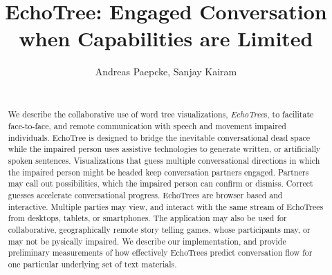 \documentclass{sigchi}
\begin{document}
\title{EchoTree: Engaged Conversation when Capabilities are Limited}



\author{
  \alignauthor Andreas Paepcke, Sanjay Kairam\\
    \\
    }



\maketitle

\begin{abstract}
We describe the collaborative use of word tree visualizations, {\em
  EchoTree}s, to facilitate face-to-face, and remote communication
with speech and movement impaired individuals. EchoTree is designed to
bridge the inevitable conversational dead space while the impaired
person uses assistive technologies to generate written, or
artificially spoken sentences. Visualizations that guess multiple
conversational directions in which the impaired person might be headed
keep conversation partners engaged. Partners may call out
possibilities, which the impaired person can confirm or
dismiss. Correct guesses accelerate conversational progress. EchoTrees
are browser based and interactive. Multiple parties may view, and
interact with the same stream of EchoTrees from desktops, tablets, or
smartphones. The application may also be used for collaborative,
geographically remote story telling games, whose participants may, or
may not be pysically impaired. We describe our implementation, and
provide preliminary measurements of how effectively EchoTrees predict
conversation flow for one particular underlying set of text
materials. 
  \end{abstract}
\end{document}
